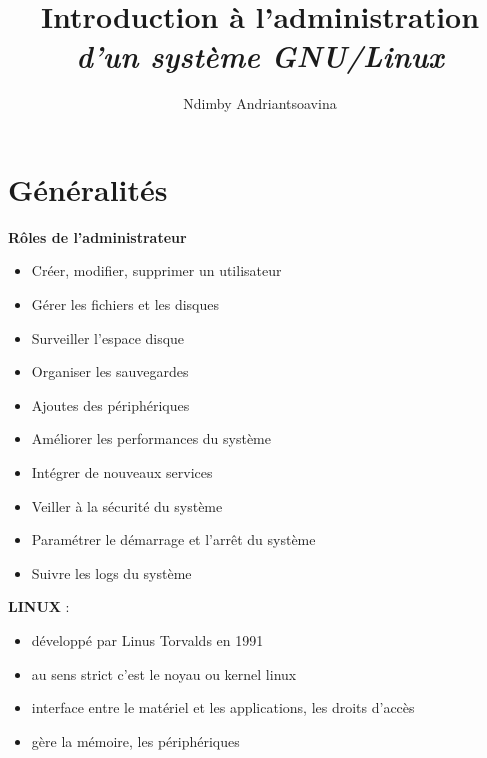 \documentclass[french]{beamer}
\title{Introduction à l'administration \\ \textit{d'un système GNU/Linux}}
\author{Ndimby Andriantsoavina}
\institute{Agence universitaire de la Francophonie}
\begin{document}
\begin{frame}
\titlepage
\end{frame}

\section{Généralités}
\frame{\tableofcontents[current]}



\begin{frame}
\begin{center}
\textbf{Rôles de l'administrateur}
\end{center}
\begin{itemize}
\item Créer, modifier, supprimer un utilisateur
\item Gérer les fichiers et les disques
\item Surveiller l'espace disque
\item Organiser les sauvegardes
\item Ajoutes des périphériques
\item Améliorer les performances du système
\item Intégrer de nouveaux services
\item Veiller à la sécurité du système
\item Paramétrer le démarrage et l'arrêt du système
\item Suivre les logs du système
\end{itemize}
\end{frame}

\begin{frame}
\textbf{LINUX} :
    \begin{itemize}
    \item développé par Linus Torvalds en 1991
    \item au sens strict c'est le noyau ou kernel linux
    \item interface entre le matériel et les applications, les droits d'accès
    \item gère la mémoire, les périphériques 
    \end{itemize}
\end{frame}
\end{document}
